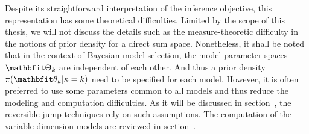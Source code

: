 \documentclass[10pt, hyper, bib, fontset=Lucida,
linespread=1.3, typearearatio=0.75]{marticle}
\begin{document}
Despite its straightforward interpretation of the inference objective, this
representation has some theoretical difficulties. Limited by the scope of this
thesis, we will not discuss the details such as the measure-theoretic
difficulty in the notions of prior density for a direct sum space.
Nonetheless, it shall be noted that in the context of Bayesian model
selection, the model parameter spaces $\bTh_k$ are independent of each other.
And thus a prior density $\pi(\bth_k|\kappa =k)$ need to be specified for each
model. However, it is often preferred to use some parameters common to all
models and thus reduce the modeling and computation difficulties. As it will
be discussed in section~, the reversible jump
\mcmc techniques rely on such assumptions. The computation of the variable
dimension models are reviewed in section~.

\ifx\inthesis\undefined
\printbibliography
\end{document}

